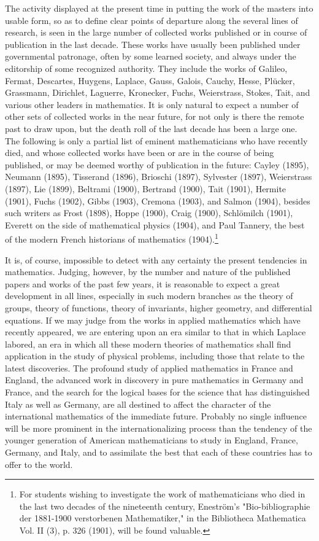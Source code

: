 \documentclass[oneside]{book}
\begin{document}
The activity displayed at the present time in putting the
work of the masters into usable form, so as to define clear points
of departure along the several lines of research, is seen in the
large number of collected works published or in course of publication
in the last decade. These works have usually been
published under governmental patronage, often by some learned
society, and always under the editorship of some recognized
authority. They include the works of Galileo, Fermat, Descartes,
Huygens, Laplace, Gauss, Galois, Cauchy, Hesse, Pl\"ucker,
Grassmann, Dirichlet, Laguerre, Kronecker, Fuchs, Weierstrass,
Stokes, Tait, and various other leaders in mathematics. It is
only natural to expect a number of other sets of collected works
in the near future, for not only is there the remote past to draw
upon, but the death roll of the last decade has been a large one.
The following is only a partial list of eminent mathematicians
who have recently died, and whose collected works have been
or are in the course of being published, or may be deemed worthy
of publication in the future: Cayley (1895), Neumann (1895),
Tisserand (1896), Brioschi (1897), Sylvester (1897), Weierstrass
(1897), Lie (1899), Beltrami (1900), Bertrand (1900), Tait (1901),
Hermite (1901), Fuchs (1902), Gibbs (1903), Cremona (1903),
and Salmon (1904), besides such writers as Frost (1898), Hoppe
(1900), Craig (1900), Schl\"omilch (1901), Everett on the side of
mathematical physics (1904), and Paul Tannery, the best of
the modern French historians of mathematics (1904).\footnote{For
students wishing to investigate the work of mathematicians who died
in the last two decades of the nineteenth century, Enestr\"om's "Bio-bibliographie
der 1881-1900 verstorbenen Mathematiker," in the Bibliotheca Mathematica
Vol. II (3), p. 326 (1901), will be found valuable.}

It is, of course, impossible to detect with any certainty the
present tendencies in mathematics. Judging, however, by the
number and nature of the published papers and works of the
past few years, it is reasonable to expect a great development in
all lines, especially in such modern branches as the theory of
groups, theory of functions, theory of invariants, higher geometry,
and differential equations. If we may judge from the works in
applied mathematics which have recently appeared, we are
entering upon an era similar to that in which Laplace labored,
an era in which all these modern theories of mathematics shall
find application in the study of physical problems, including
those that relate to the latest discoveries. The profound study
of applied mathematics in France and England, the advanced
work in discovery in pure mathematics in Germany and France,
and the search for the logical bases for the science that has distinguished
Italy as well as Germany, are all destined to affect the
character of the international mathematics of the immediate
future. Probably no single influence will be more prominent
in the internationalizing process than the tendency of the younger
generation of American mathematicians to study in England,
France, Germany, and Italy, and to assimilate the best that each
of these countries has to offer to the world.
\end{document}
